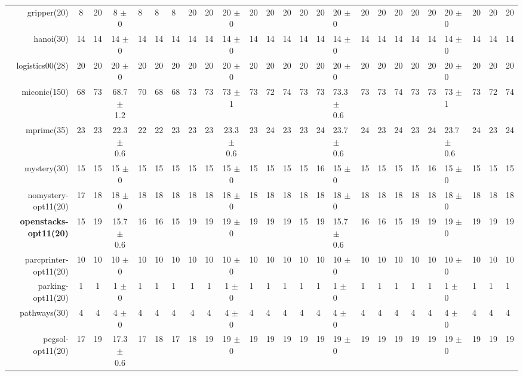 \begin{center}
\begin{tabular}{|rcccHHH|cccHHHHHHHHHHHHHHH|}
gripper(20) & 8 & 20 & 8 \(\pm\) 0 & 8 & 8 & 8 & 20 & 20 & 20 \(\pm\) 0 & 20 & 20 & 20 & 20 & 20 & 20 \(\pm\) 0 & 20 & 20 & 20 & 20 & 20 & 20 \(\pm\) 0 & 20 & 20 & 20\\
hanoi(30) & 14 & 14 & 14 \(\pm\) 0 & 14 & 14 & 14 & 14 & 14 & 14 \(\pm\) 0 & 14 & 14 & 14 & 14 & 14 & 14 \(\pm\) 0 & 14 & 14 & 14 & 14 & 14 & 14 \(\pm\) 0 & 14 & 14 & 14\\
logistics00(28) & 20 & 20 & 20 \(\pm\) 0 & 20 & 20 & 20 & 20 & 20 & 20 \(\pm\) 0 & 20 & 20 & 20 & 20 & 20 & 20 \(\pm\) 0 & 20 & 20 & 20 & 20 & 20 & 20 \(\pm\) 0 & 20 & 20 & 20\\
miconic(150) & 68 & 73 & 68.7 \(\pm\) 1.2 & 70 & 68 & 68 & 73 & 73 & 73 \(\pm\) 1 & 73 & 72 & 74 & 73 & 73 & 73.3 \(\pm\) 0.6 & 73 & 73 & 74 & 73 & 73 & 73 \(\pm\) 1 & 73 & 72 & 74\\
mprime(35) & 23 & 23 & 22.3 \(\pm\) 0.6 & 22 & 22 & 23 & 23 & 23 & 23.3 \(\pm\) 0.6 & 23 & 24 & 23 & 23 & 24 & 23.7 \(\pm\) 0.6 & 24 & 23 & 24 & 23 & 24 & 23.7 \(\pm\) 0.6 & 24 & 23 & 24\\
mystery(30) & 15 & 15 & 15 \(\pm\) 0 & 15 & 15 & 15 & 15 & 15 & 15 \(\pm\) 0 & 15 & 15 & 15 & 15 & 16 & 15 \(\pm\) 0 & 15 & 15 & 15 & 15 & 16 & 15 \(\pm\) 0 & 15 & 15 & 15\\
nomystery-opt11(20) & 17 & 18 & 18 \(\pm\) 0 & 18 & 18 & 18 & 18 & 18 & 18 \(\pm\) 0 & 18 & 18 & 18 & 18 & 18 & 18 \(\pm\) 0 & 18 & 18 & 18 & 18 & 18 & 18 \(\pm\) 0 & 18 & 18 & 18\\
\textbf{openstacks-opt11(20)} & 15 & 19 & 15.7 \(\pm\) 0.6 & 16 & 16 & 15 & 19 & 19 & 19 \(\pm\) 0 & 19 & 19 & 19 & 15 & 19 & 15.7 \(\pm\) 0.6 & 16 & 16 & 15 & 19 & 19 & 19 \(\pm\) 0 & 19 & 19 & 19\\
parcprinter-opt11(20) & 10 & 10 & 10 \(\pm\) 0 & 10 & 10 & 10 & 10 & 10 & 10 \(\pm\) 0 & 10 & 10 & 10 & 10 & 10 & 10 \(\pm\) 0 & 10 & 10 & 10 & 10 & 10 & 10 \(\pm\) 0 & 10 & 10 & 10\\
parking-opt11(20) & 1 & 1 & 1 \(\pm\) 0 & 1 & 1 & 1 & 1 & 1 & 1 \(\pm\) 0 & 1 & 1 & 1 & 1 & 1 & 1 \(\pm\) 0 & 1 & 1 & 1 & 1 & 1 & 1 \(\pm\) 0 & 1 & 1 & 1\\
pathways(30) & 4 & 4 & 4 \(\pm\) 0 & 4 & 4 & 4 & 4 & 4 & 4 \(\pm\) 0 & 4 & 4 & 4 & 4 & 4 & 4 \(\pm\) 0 & 4 & 4 & 4 & 4 & 4 & 4 \(\pm\) 0 & 4 & 4 & 4\\
pegsol-opt11(20) & 17 & 19 & 17.3 \(\pm\) 0.6 & 17 & 18 & 17 & 18 & 19 & 19 \(\pm\) 0 & 19 & 19 & 19 & 19 & 19 & 19 \(\pm\) 0 & 19 & 19 & 19 & 19 & 19 & 19 \(\pm\) 0 & 19 & 19 & 19\\

\end{tabular}
\end{center}
